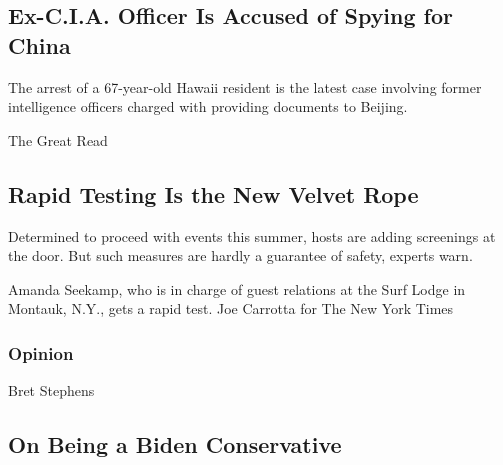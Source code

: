 \href{/2020/08/17/us/politics/china-spying-alexander-yuk-ching-ma.html}{}

\hypertarget{ex-cia-officer-is-accused-of-spying-for-china}{%
\subsection{Ex-C.I.A. Officer Is Accused of Spying for
China}\label{ex-cia-officer-is-accused-of-spying-for-china}}

The arrest of a 67-year-old Hawaii resident is the latest case involving
former intelligence officers charged with providing documents to
Beijing.

\href{/2020/08/16/style/does-rapid-covid-testing-work-weddings-parties.html}{}

The Great Read

\hypertarget{rapid-testing-is-the-new-velvet-rope}{%
\subsection{Rapid Testing Is the New Velvet
Rope}\label{rapid-testing-is-the-new-velvet-rope}}

Determined to proceed with events this summer, hosts are adding
screenings at the door. But such measures are hardly a guarantee of
safety, experts warn.

\href{/2020/08/16/style/does-rapid-covid-testing-work-weddings-parties.html}{}

Amanda Seekamp, who is in charge of guest relations at the Surf Lodge in
Montauk, N.Y., gets a rapid test. Joe Carrotta for The New York Times

\href{https://www.nytimes3xbfgragh.onion/section/opinion?pagetype=Homepage\&action=click\&module=Opinion}{}

\hypertarget{opinion}{%
\subsubsection{Opinion}\label{opinion}}

\href{/2020/08/17/opinion/joe-biden-conservative-2020.html}{}

Bret Stephens

\hypertarget{on-being-a-biden-conservative}{%
\subsection{On Being a Biden
Conservative}\label{on-being-a-biden-conservative}}

